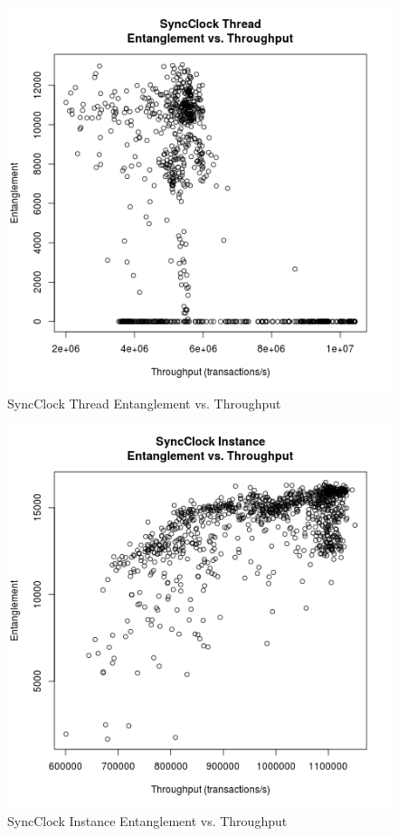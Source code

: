 \begin{figure}
\center
\includegraphics[height=.4\textheight]{sync_thread_throughput_entanglement.png}
\caption{SyncClock Thread Entanglement vs. Throughput}
\label{sync_thread_throughput_entanglement}
\end{figure}

\begin{figure}
\center
\includegraphics[height=.4\textheight]{sync_instance_throughput_entanglement.png}
\caption{SyncClock Instance Entanglement vs. Throughput}
\label{sync_instance_throughput_entanglement}
\end{figure}

